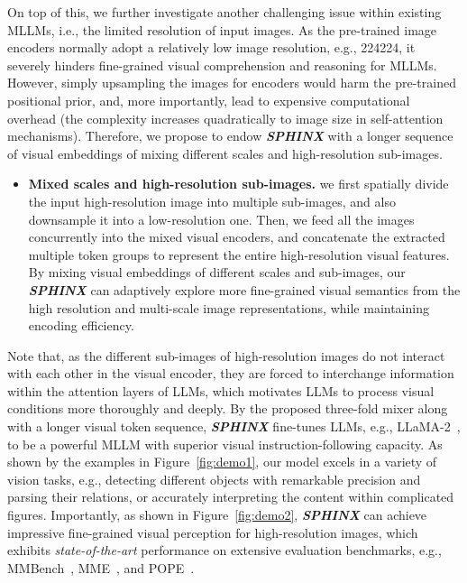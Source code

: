 \documentclass{article} \usepackage{iclr2024_conference,times}
\begin{document}
On top of this, we further investigate another challenging issue within existing MLLMs, i.e., the limited resolution of input images. As the pre-trained image encoders normally adopt a relatively low image resolution, e.g., 224224, it severely hinders fine-grained visual comprehension and reasoning for MLLMs. However, simply upsampling the images for encoders would harm the pre-trained positional prior, and, more importantly, lead to expensive computational overhead (the complexity increases quadratically to image size in self-attention mechanisms). 
Therefore, we propose to endow \textcolor{Goldenrod3}{\textbf{\textit{SPHINX}}} with a longer sequence of visual embeddings of mixing different scales and high-resolution sub-images. 
\begin{itemize} 
\item \textbf{Mixed scales and high-resolution sub-images.} we first spatially divide the input high-resolution image into multiple sub-images, and also downsample it into a low-resolution one. Then, we feed all the images concurrently into the mixed visual encoders, and concatenate the extracted multiple token groups to represent the entire high-resolution visual features. 
By mixing visual embeddings of different scales and sub-images, our \textcolor{Goldenrod3}{\textbf{\textit{SPHINX}}} can adaptively explore more fine-grained visual semantics from the high resolution and multi-scale image representations, while maintaining encoding efficiency.
\end{itemize} 


Note that, as the different sub-images of high-resolution images do not interact with each other in the visual encoder, they are forced to interchange information within the attention layers of LLMs, which motivates LLMs to process visual conditions more thoroughly and deeply. 
By the proposed three-fold mixer along with a longer visual token sequence, \textcolor{Goldenrod3}{\textbf{\textit{SPHINX}}} fine-tunes LLMs, e.g., LLaMA-2~\citep{Touvron2023Llama2O}, to be a powerful MLLM with superior visual instruction-following capacity. As shown by the examples in Figure~\ref{fig:demo1}, our model excels in a variety of vision tasks, e.g., detecting different objects with remarkable precision and parsing their relations, or accurately interpreting the content within complicated figures. Importantly, as shown in Figure~\ref{fig:demo2}, \textcolor{Goldenrod3}{\textbf{\textit{SPHINX}}} can achieve impressive fine-grained visual perception for high-resolution images, which exhibits \textit{state-of-the-art} performance on extensive evaluation benchmarks, e.g., MMBench~\citep{Liu2023MMBenchIY}, MME~\citep{Fu2023MMEAC}, and POPE~\citep{Li2023EvaluatingOH}.
\end{document}
